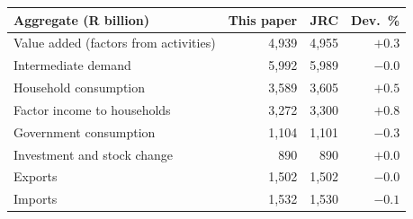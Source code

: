\begin{tabular}{lrrr}
\toprule
Aggregate (R billion) & This paper & JRC & Dev.\ \% \\
\midrule
Value added (factors from activities) & 4,939 & 4,955 & $+0.3$ \\
Intermediate demand & 5,992 & 5,989 & $-0.0$ \\
Household consumption & 3,589 & 3,605 & $+0.5$ \\
Factor income to households & 3,272 & 3,300 & $+0.8$ \\
Government consumption & 1,104 & 1,101 & $-0.3$ \\
Investment and stock change & 890 & 890 & $+0.0$ \\
Exports & 1,502 & 1,502 & $-0.0$ \\
Imports & 1,532 & 1,530 & $-0.1$ \\
\bottomrule
\end{tabular}
